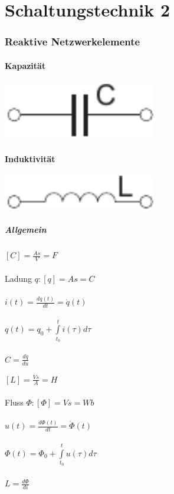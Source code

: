 \documentclass[a4paper,twocolumn,10pt]{article}
\begin{document}
\part*{Schaltungstechnik 2}

\section*{Reaktive Netzwerkelemente}

\begin{minipage}[t]{0.23\textwidth}
\subsection*{Kapazität}
\includegraphics[width=0.5\textwidth]{img/Kapazitaet}
\end{minipage}
\hfill
\begin{minipage}[t]{0.23\textwidth}
\subsection*{Induktivität}
\includegraphics[width=0.5\textwidth]{img/Induktivitaet}
\end{minipage}

\subsubsection*{Allgemein}
\begin{minipage}[b]{0.23\textwidth}
$[C]=\frac{As}{V}=F$\\\\
Ladung $q: [q]=As=C$\\\\
$i(t) = \frac{dq(t)}{dt}= \dot q(t)$\\\\
$q(t)=q_0+\int\limits_{t_0}^{t}i(\tau)d\tau$\\\\
$C=\frac{dq}{du}$
\end{minipage}
\hfill
\begin{minipage}[b]{0.23\textwidth}
$[L]=\frac{Vs}{A}=H$\\\\
Fluss $\Phi: [\Phi]=Vs=Wb$\\\\
$u(t) = \frac{d\Phi(t)}{dt}= \dot \Phi(t)$\\\\
$\Phi(t)=\Phi_0+\int\limits_{t_0}^{t}u(\tau)d\tau$\\\\
$L=\frac{d\Phi}{di}$
\end{minipage}
\end{document}
